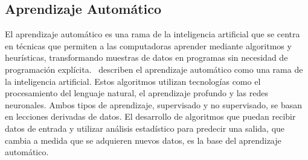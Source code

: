 \subsection{Aprendizaje Automático}
El aprendizaje automático es una rama de la inteligencia artificial que se centra en técnicas que permiten a las computadoras aprender mediante algoritmos y heurísticas, transformando muestras de datos en programas sin necesidad de programación explícita. \parencite{bk_russell2009intart} describen el aprendizaje automático como una rama de la inteligencia artificial. Estos algoritmos utilizan tecnologías como el procesamiento del lenguaje natural, el aprendizaje profundo y las redes neuronales. Ambos tipos de aprendizaje, supervisado y no supervisado, se basan en lecciones derivadas de datos. El desarrollo de algoritmos que puedan recibir datos de entrada y utilizar análisis estadístico para predecir una salida, que cambia a medida que se adquieren nuevos datos, es la base del aprendizaje automático. \parencite{bk_alpaydin2014ml}

